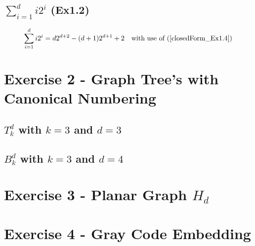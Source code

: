 \subsection{$\sum_{i=1}^d i2^i$ (Ex1.2)}

\begin{equation}
    \begin{aligned}
        \sum_{i=1}^d i2^i = d  2^{d+2} - (d+1)2^{d+1} + 2 \quad \text{with use of (\ref{closedForm_Ex1.4})}
    \end{aligned}
\end{equation}

\pagebreak





\section{Exercise 2 - Graph Tree's with Canonical Numbering}
\subsection{$T^d_k$ with $k=3$ and $d=3$}


\subsection{$B^d_k$ with $k=3$ and $d=4$}

\section{Exercise 3 - Planar Graph $H_d$}

\section{Exercise 4 - Gray Code Embedding}